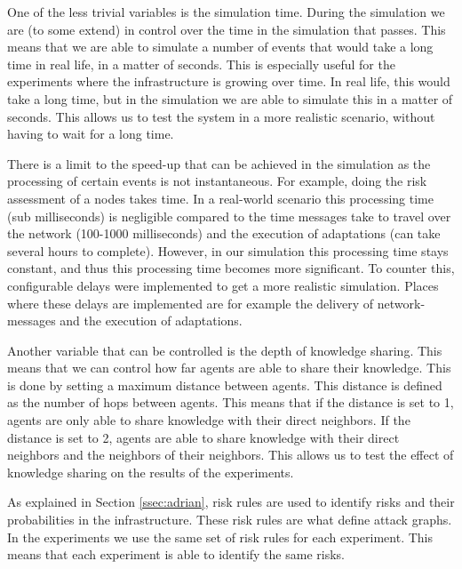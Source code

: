 
\label{sssec:simulation-time}
One of the less trivial variables is the simulation time. During the simulation we are (to some extend) in control over the time in the simulation that passes. This means that we are able to simulate a number of events that would take a long time in real life, in a matter of seconds. This is especially useful for the experiments where the infrastructure is growing over time. In real life, this would take a long time, but in the simulation we are able to simulate this in a matter of seconds. This allows us to test the system in a more realistic scenario, without having to wait for a long time.

There is a limit to the speed-up that can be achieved in the simulation as the processing of certain events is not instantaneous. For example, doing the risk assessment of a nodes takes time. In a real-world scenario this processing time (sub milliseconds) is negligible compared to the time messages take to travel over the network (100-1000 milliseconds) and the execution of adaptations (can take several hours to complete). However, in our simulation this processing time stays constant, and thus this processing time becomes more significant. To counter this, configurable delays were implemented to get a more realistic simulation. 
Places where these delays are implemented are for example the delivery of network-messages and the execution of adaptations. 

\label{sssec:knowledge-depth}
Another variable that can be controlled is the depth of knowledge sharing. This means that we can control how far agents are able to share their knowledge. This is done by setting a maximum distance between agents. This distance is defined as the number of hops between agents. This means that if the distance is set to 1, agents are only able to share knowledge with their direct neighbors. If the distance is set to 2, agents are able to share knowledge with their direct neighbors and the neighbors of their neighbors. This allows us to test the effect of knowledge sharing on the results of the experiments.

\label{sssec:risk-rules}
As explained in Section \ref{ssec:adrian}, risk rules are used to identify risks and their probabilities in the infrastructure. These risk rules are what define attack graphs. In the experiments we use the same set of risk rules for each experiment. This means that each experiment is able to identify the same risks.

